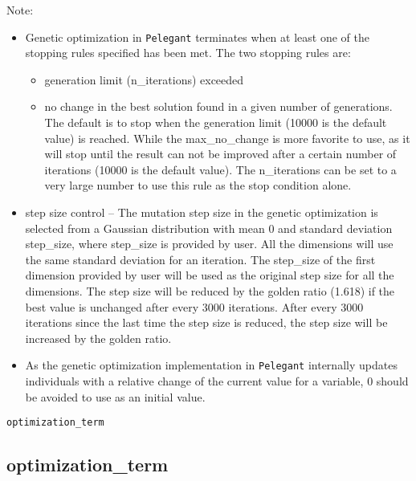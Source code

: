 \documentclass[11pt]{article}
\begin{document}
Note:
\begin{itemize}
\item Genetic optimization in {\tt Pelegant} terminates when at least one of the stopping rules specified has been met. 
The two stopping rules are: 

\begin{itemize}
\item generation limit (n\_iterations) exceeded
\item no change in the best solution found in a given number of generations. 
The default is to stop when the generation limit (10000 is the default value) is reached. While the max\_no\_change is more favorite to use, as it will stop until the result can not be improved after a certain number of iterations (10000 is the default value). The n\_iterations can be set 
to a very large number to use this rule as the stop condition alone.
\end{itemize}

\item step size control -- The mutation step size in the genetic optimization is selected from a Gaussian distribution with mean 0 and standard deviation step\_size, where step\_size is provided by user. All the dimensions will use the same standard deviation for an iteration. The step\_size of the first dimension provided by user will be used as the original step size for all the dimensions. The step size will be reduced by the golden ratio (1.618) if the best value is unchanged after every 3000 iterations. After every 3000 iterations since the last time the step size is reduced, the step size will be increased by the golden ratio.

\item As the genetic optimization implementation in {\tt Pelegant} internally updates individuals with a relative change of the current value for a variable, 0 should be avoided to use as an initial value.

\end{itemize}

\newpage
\begin{center}{\Large\verb|optimization_term|}\end{center}
\subsection{optimization\_term \label{subsec:optimizationterm}}
\end{document}
